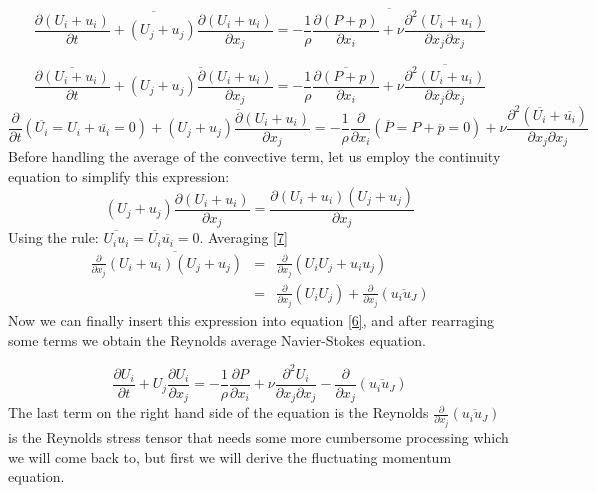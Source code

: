 \documentclass[11pt]{article}
\begin{document}
{\[
\overline{\frac{\partial(U_{i}+u_{i})}{\partial t}+(U_{j}+u_{j})\frac{\partial(U_{i}+u_{i})}{\partial x_{j}}}
=\overline{-\frac{1}{\rho}\frac{\partial(P+p)}{\partial x_{i}}+\nu\frac{\partial^{2}(U_{i}+u_{i})}{\partial x_{j}\partial x_{j}}}
\]

\[
\overline{\frac{\partial(U_{i}+u_{i})}{\partial t}}+\overline{(U_{j}+u_{j})\frac{\partial(U_{i}+u_{i})}{\partial x_{j}}}
=-\frac{1}{\rho}\overline{\frac{\partial(P+p)}{\partial x_{i}}}+\nu\overline{\frac{\partial^{2}(U_{i}+u_{i})}{\partial x_{j}\partial x_{j}}}
\]
\begin{equation}
\label{7}
\frac{\partial}{\partial t}(\overline{U_{i}}=U_{i}+\overline{u_{i}}=0)+\overline{(U_{j}+u_{j})\frac{\partial(U_{i}+u_{i})}{\partial x_{j}}
}=-\frac{1}{\rho}\frac{\partial}{\partial x_{i}}(\overline{P}=P+\overline{p}=0)+\nu\frac{\partial^{2}(\overline{U_{i}}+\overline{u_{i}})}{\partial x_{j}\partial x_{j}}
\end{equation}
Before handling the average of the convective term, let us employ
the continuity equation to simplify this expression:
\begin{equation}
\label{8}
(U_{j}+u_{j})\frac{\partial(U_{i}+u_{i})}{\partial x_{j}}=\frac{\partial(U_{i}+u_{i})(U_{j}+u_{j})}{\partial x_{j}}
\end{equation}
Using the rule: $\overline{U_{i}u_{i}}=\overline{U_{i}}\overline{u_{i}}=0$.
Averaging \eqref{7}
\begin{eqnarray*}
\frac{\partial}{\partial x_{j}}\overline{(U_{i}+u_{i})(U_{j}+u_{j})} & = & \frac{\partial}{\partial x_{j}}(U_{i}U_{j}+u_{i}u_{j})\\
 & = & \frac{\partial}{\partial x_{j}}(U_{i}U_{j})+\frac{\partial}{\partial x_{j}}(\overline{u_{i}u_{J}})
\end{eqnarray*}
Now we can finally insert this expression into equation \eqref{6}, and after
rearraging some terms we obtain the Reynolds average Navier-Stokes
equation.

\begin{equation}
\label{9}
\frac{\partial U_{i}}{\partial t}+U_{j}\frac{\partial U_{i}}{\partial x_{j}}
=-\frac{1}{\rho}\frac{\partial P}{\partial x_{i}}+\nu\frac{\partial^{2}U_{i}}{\partial x_{j}\partial x_{j}}-\frac{\partial}{\partial x_{j}}(\overline{u_{i}u_{J}})
\end{equation}
The last term on the right hand side of the equation is the Reynolds
$\frac{\partial}{\partial x_{j}}(\overline{u_{i}u_{J}})$ is the Reynolds
stress tensor that needs some more cumbersome processing which we
will come back to, but first we will derive the fluctuating momentum
equation. 


}
\end{document}
